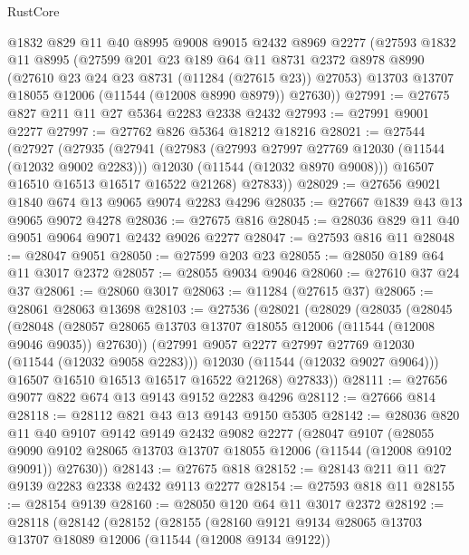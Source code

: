 \begin{lexlean}{RustCore}
\begin{coremodule}
    @1832
    @829
    @11
    @40
    @8995
    @9008
    @9015
    @2432
    @8969
    @2277
    (@27593
      @1832
      @11
      @8995
      (@27599
        @201
        @23
        @189
        @64
        @11
        @8731
        @2372
        @8978
        @8990
        (@27610 @23 @24 @23 @8731 (@11284 (@27615 @23)) @27053)
        @13703
        @13707
        @18055
        @12006
        (@11544 (@12008 @8990 @8979))
        @27630))
@27991 := @27675 @827 @211 @11 @27 @5364 @2283 @2338 @2432
@27993 := @27991 @9001 @2277
@27997 := @27762 @826 @5364 @18212 @18216
@28021 := @27544
    (@27927
      (@27935
        (@27941
          (@27983
            (@27993 @27997 @27769 @12030 (@11544 (@12032 @9002 @2283)))
            @12030
            (@11544 (@12032 @8970 @9008)))
          @16507
          @16510
          @16513
          @16517
          @16522
          @21268)
        @27833))
@28029 := @27656 @9021 @1840 @674 @13 @9065 @9074 @2283 @4296
@28035 := @27667 @1839 @43 @13 @9065 @9072 @4278
@28036 := @27675 @816
@28045 := @28036 @829 @11 @40 @9051 @9064 @9071 @2432 @9026 @2277
@28047 := @27593 @816 @11
@28048 := @28047 @9051
@28050 := @27599 @203 @23
@28055 := @28050 @189 @64 @11 @3017 @2372
@28057 := @28055 @9034 @9046
@28060 := @27610 @37 @24 @37
@28061 := @28060 @3017
@28063 := @11284 (@27615 @37)
@28065 := @28061 @28063 @13698
@28103 := @27536
    (@28021
      (@28029
        (@28035
          (@28045
            (@28048
              (@28057 @28065 @13703 @13707 @18055 @12006 (@11544 (@12008 @9046 @9035)) @27630))
            (@27991 @9057 @2277 @27997 @27769 @12030 (@11544 (@12032 @9058 @2283)))
            @12030
            (@11544 (@12032 @9027 @9064)))
          @16507
          @16510
          @16513
          @16517
          @16522
          @21268)
        @27833))
@28111 := @27656 @9077 @822 @674 @13 @9143 @9152 @2283 @4296
@28112 := @27666 @814
@28118 := @28112 @821 @43 @13 @9143 @9150 @5305
@28142 := @28036
    @820
    @11
    @40
    @9107
    @9142
    @9149
    @2432
    @9082
    @2277
    (@28047
      @9107
      (@28055 @9090 @9102 @28065 @13703 @13707 @18055 @12006 (@11544 (@12008 @9102 @9091)) @27630))
@28143 := @27675 @818
@28152 := @28143 @211 @11 @27 @9139 @2283 @2338 @2432 @9113 @2277
@28154 := @27593 @818 @11
@28155 := @28154 @9139
@28160 := @28050 @120 @64 @11 @3017 @2372
@28192 := @28118
    (@28142
      (@28152
        (@28155
          (@28160
            @9121
            @9134
            @28065
            @13703
            @13707
            @18089
            @12006
            (@11544 (@12008 @9134 @9122))

\end{coremodule}
\end{lexlean}
